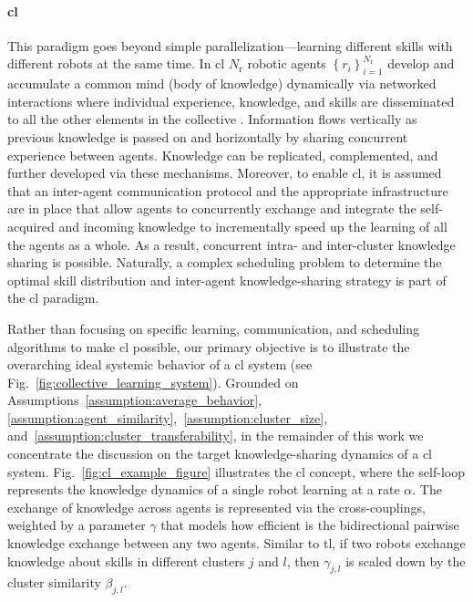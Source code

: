 \documentclass[12pt]{article}
\begin{document}

\paragraph*{\textbf{\Acl{cl}}}
This paradigm goes beyond simple parallelization---learning different skills with different robots at the same time. In \ac{cl} $N_\mathrm{r}$ robotic agents $ \left\lbrace r_i \right\rbrace_{i=1}^{N_\mathrm{r}} $ develop and accumulate a common mind (body of knowledge) dynamically via networked interactions where individual experience, knowledge, and skills are disseminated to all the other elements in the collective \cite{Garavan2012CollectiveLearning}. Information flows vertically as previous knowledge is passed on and horizontally by sharing concurrent experience between agents. Knowledge can be replicated, complemented, and further developed via these mechanisms. Moreover, to enable \ac{cl}, it is assumed that an inter-agent communication protocol and the appropriate infrastructure are in place that allow agents to concurrently exchange and integrate the self-acquired and incoming knowledge to incrementally speed up the learning of all the agents as a whole. As a result, concurrent intra- and inter-cluster knowledge sharing is possible. Naturally, a complex scheduling problem to determine the optimal skill distribution and inter-agent knowledge-sharing strategy is part of the \ac{cl} paradigm. 

Rather than focusing on specific learning, communication, and scheduling algorithms to make \ac{cl} possible, our primary objective is to illustrate the overarching ideal systemic behavior of a \acl{cl} system (see Fig.~\ref{fig:collective_learning_system}). Grounded on Assumptions~\ref{assumption:average_behavior}, \ref{assumption:agent_similarity},~\ref{assumption:cluster_size}, and~\ref{assumption:cluster_transferability}, in the remainder of this work we concentrate the discussion on the target knowledge-sharing dynamics of a \ac{cl} system. Fig.~\ref{fig:cl_example_figure} illustrates the \ac{cl} concept, where the self-loop represents the knowledge dynamics of a single robot learning at a rate $\alpha$. The exchange of knowledge across agents is represented via the cross-couplings, weighted by a parameter $\gamma$ that models how efficient is the bidirectional pairwise knowledge exchange between any two agents. Similar to \ac{tl}, if two robots exchange knowledge about skills in different clusters $j$ and $l$, then $\gamma_{j,l}$ is scaled down by the cluster similarity $\beta_{j,l}$. 
\end{document}
